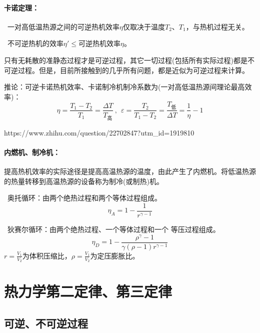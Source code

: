 \documentclass[zihao=5,UTF8]{report}
\begin{document}
\subsubsection{卡诺定理：}
\ 一对高低温热源之间的可逆热机效率$\eta$仅取决于温度$T_2$、$T_1$，与热机过程无关。\par
{}\ 不可逆热机的效率$\eta' \le $可逆热机效率$\eta$。
{\par\color{gray}\small 只有无耗散的准静态过程才是可逆过程，其它一切过程(包括所有实际过程)都是不可逆过程。但是，目前所接触到的几乎所有问题，都是近似为可逆过程来计算。}\par
推论：可逆卡诺热机效率、卡诺制冷机制冷系数为(一对高低温热源间理论最高效率)：
\begin{equation}
    \eta = \frac{T_1 - T_2}{T_1} = \frac{\Delta T}{T_{\text{高}}}\ ,\ \ \varepsilon = \frac{T_2}{T_1 - T_2} =\frac{T_{\text{低}}}{\Delta T} = \frac{1}{\eta} -1
\end{equation}

https://www.zhihu.com/question/22702847?utm\_id=1919810 \par


\subsubsection{内燃机、制冷机：}
提高热机效率的实际途径是提高高温热源的温度，由此产生了内燃机。将低温热源的热量转移到高温热源的设备称为制冷(或制热)机。\par
{}\ 奥托循环：由两个绝热过程和两个等体过程组成。
\begin{equation}
    \eta_A = 1 - \frac{1}{r^{\gamma -1}}
\end{equation}

\par
{}\ 狄赛尔循环：由两个绝热过程、一个等体过程和一个 等压过程组成。
\begin{equation}
    \eta_D =1- \frac{\rho^{\gamma} -1}{\gamma(\rho -1) r^{\gamma -1}}
\end{equation}
{\color{gray}\small $r = \frac{V_1}{V_2}$为体积压缩比，$\rho = \frac{V_1}{V_2}$为定压膨胀比。}
\chapter{热力学第二定律、第三定律}
\section{可逆、不可逆过程}
\end{document}
